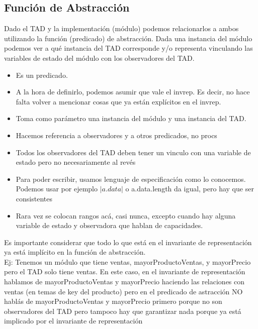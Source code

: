 \documentclass[10pt,a4paper]{article}
\begin{document}
\subsection*{Función de Abstracción}
Dado el TAD y la implementación (módulo) podemos relacionarlos a ambos utilizando la función (predicado) de abstracción. Dada una instancia del módulo podemos ver a qué instancia del TAD corresponde y/o representa vinculando las variables de estado del módulo con los observadores del TAD.
\begin{itemize}
    \item Es un predicado.
    \item A la hora de definirlo, podemos asumir que vale el invrep. Es decir, no hace falta volver a mencionar cosas que ya están explícitos en el invrep.
    \item Toma como parámetro una instancia del módulo y una instancia del TAD.
    \item Hacemos referencia a observadores y a otros predicados, no procs
    \item Todos los observadores del TAD deben tener un vinculo con una variable de estado pero no necesariamente al revés
    \item Para poder escribir, usamos lenguaje de especificación como lo conocemos. Podemos usar por ejemplo $|a.data|$ o a.data.length da igual, pero hay que ser consistentes
    \item Rara vez se colocan rangos acá, casi nunca, excepto cuando hay alguna variable de estado y observadora que hablan de capacidades.
\end{itemize}
Es importante considerar que todo lo que está en el invariante de representación ya está implícito en la función de abstracción. \\
Ej: Tenemos un módulo que tiene ventas, mayorProductoVentas, y mayorPrecio pero el TAD solo tiene ventas. En este caso, en el invariante de representación hablamos de mayorProductoVentas y mayorPrecio haciendo las relaciones con ventas (en temas de key del producto) pero en el predicado de astracción NO hablás de mayorProductoVentas y mayorPrecio primero porque no son observadores del TAD pero tampoco hay que garantizar nada porque ya está implicado por el invariante de representación
\end{document}
